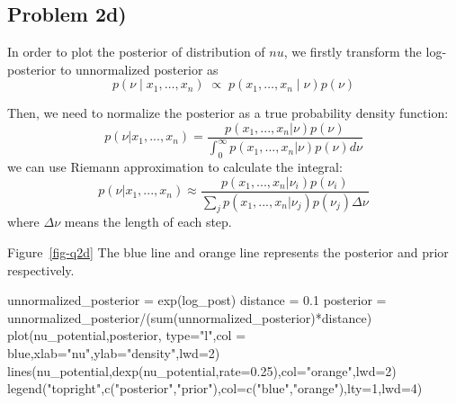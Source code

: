 \documentclass[
  letterpaper,
  DIV=11,
  numbers=noendperiod]{scrartcl}
\newenvironment{Shaded}{\begin{snugshade}}{\end{snugshade}}
\newcommand{\AttributeTok}[1]{\textcolor[rgb]{0.40,0.45,0.13}{#1}}
\newcommand{\DecValTok}[1]{\textcolor[rgb]{0.68,0.00,0.00}{#1}}
\newcommand{\FloatTok}[1]{\textcolor[rgb]{0.68,0.00,0.00}{#1}}
\newcommand{\FunctionTok}[1]{\textcolor[rgb]{0.28,0.35,0.67}{#1}}
\newcommand{\NormalTok}[1]{\textcolor[rgb]{0.00,0.23,0.31}{#1}}
\newcommand{\OtherTok}[1]{\textcolor[rgb]{0.00,0.23,0.31}{#1}}
\newcommand{\SpecialCharTok}[1]{\textcolor[rgb]{0.37,0.37,0.37}{#1}}
\newcommand{\StringTok}[1]{\textcolor[rgb]{0.13,0.47,0.30}{#1}}
\begin{document}
\subsection{Problem 2d)}\label{problem-2d}

In order to plot the posterior of distribution of \(nu\), we firstly
transform the log-posterior to unnormalized posterior as
\[p(\nu \mid x_1,\dots,x_n) \;\propto\;  p(x_1,\dots,x_n \mid \nu) p(\nu)\]

Then, we need to normalize the posterior as a true probability density
function:
\[p(\nu|x_1,...,x_n)=\frac{p(x_1,...,x_n|\nu)p(\nu)}{\int_0^{\infty}p(x_1,...,x_n|\nu)p(\nu)d\nu}\]
we can use Riemann approximation to calculate the integral:
\[p(\nu|x_1,...,x_n)\approx \frac{p(x_1,...,x_n|\nu_i)p(\nu_i)}{\sum_j p(x_1,...,x_n|\nu_j)p(\nu_j)\Delta\nu}\]
where \(\Delta\nu\) means the length of each step.

Figure~\ref{fig-q2d} The blue line and orange line represents the
posterior and prior respectively.

\begin{Shaded}
\begin{Highlighting}[]
\NormalTok{unnormalized\_posterior }\OtherTok{=} \FunctionTok{exp}\NormalTok{(log\_post)}
\NormalTok{distance }\OtherTok{=} \FloatTok{0.1}
\NormalTok{posterior }\OtherTok{=}\NormalTok{ unnormalized\_posterior}\SpecialCharTok{/}\NormalTok{(}\FunctionTok{sum}\NormalTok{(unnormalized\_posterior)}\SpecialCharTok{*}\NormalTok{distance)}
\FunctionTok{plot}\NormalTok{(nu\_potential,posterior, }\AttributeTok{type=}\StringTok{"l"}\NormalTok{,}\AttributeTok{col =} \StringTok{\textquotesingle{}blue\textquotesingle{}}\NormalTok{,}\AttributeTok{xlab=}\StringTok{"nu"}\NormalTok{,}\AttributeTok{ylab=}\StringTok{"density"}\NormalTok{,}\AttributeTok{lwd=}\DecValTok{2}\NormalTok{)}
\FunctionTok{lines}\NormalTok{(nu\_potential,}\FunctionTok{dexp}\NormalTok{(nu\_potential,}\AttributeTok{rate=}\FloatTok{0.25}\NormalTok{),}\AttributeTok{col=}\StringTok{"orange"}\NormalTok{,}\AttributeTok{lwd=}\DecValTok{2}\NormalTok{)}
\FunctionTok{legend}\NormalTok{(}\StringTok{"topright"}\NormalTok{,}\FunctionTok{c}\NormalTok{(}\StringTok{"posterior"}\NormalTok{,}\StringTok{"prior"}\NormalTok{),}\AttributeTok{col=}\FunctionTok{c}\NormalTok{(}\StringTok{"blue"}\NormalTok{,}\StringTok{"orange"}\NormalTok{),}\AttributeTok{lty=}\DecValTok{1}\NormalTok{,}\AttributeTok{lwd=}\DecValTok{4}\NormalTok{)}
\end{Highlighting}
\end{Shaded}
\end{document}
